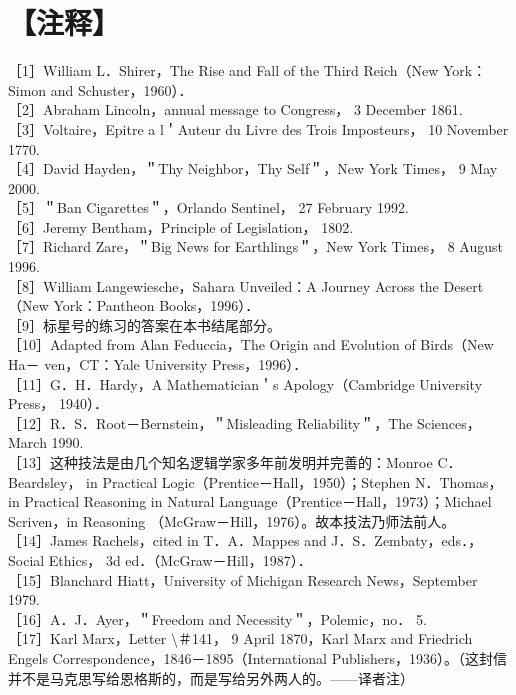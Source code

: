 \section*{【注释】}
［1］William L．Shirer，The Rise and Fall of the Third Reich（New York：Simon and Schuster，1960）．\\
［2］Abraham Lincoln，annual message to Congress， 3 December 1861.\\
［3］Voltaire，Epitre a l＇Auteur du Livre des Trois Imposteurs， 10 November\\
1770.\\
［4］David Hayden，＂Thy Neighbor，Thy Self＂，New York Times， 9 May 2000.\\
［5］＂Ban Cigarettes＂，Orlando Sentinel， 27 February 1992.\\
［6］Jeremy Bentham，Principle of Legislation， 1802.\\
［7］Richard Zare，＂Big News for Earthlings＂，New York Times， 8 August 1996.\\
［8］William Langewiesche，Sahara Unveiled：A Journey Across the Desert（New York：Pantheon Books，1996）．\\
［9］标星号的练习的答案在本书结尾部分。\\
［10］Adapted from Alan Feduccia，The Origin and Evolution of Birds（New Ha－ ven，CT：Yale University Press，1996）．\\
［11］G．H．Hardy，A Mathematician＇s Apology（Cambridge University Press， 1940）．\\
［12］R．S．Root－Bernstein，＂Misleading Reliability＂，The Sciences，March 1990.\\
［13］这种技法是由几个知名逻辑学家多年前发明并完善的：Monroe C．Beardsley， in Practical Logic（Prentice－Hall，1950）；Stephen N．Thomas，in Practical Reasoning in Natural Language（Prentice－Hall，1973）；Michael Scriven，in Reasoning （McGraw－Hill，1976）。故本技法乃师法前人。\\
［14］James Rachels，cited in T．A．Mappes and J．S．Zembaty，eds．，Social Ethics， 3d ed．（McGraw－Hill，1987）．\\
［15］Blanchard Hiatt，University of Michigan Research News，September 1979.\\
［16］A．J．Ayer，＂Freedom and Necessity＂，Polemic，no． 5.\\
［17］Karl Marx，Letter \textbackslash ＃141， 9 April 1870，Karl Marx and Friedrich Engels Correspondence，1846－1895（International Publishers，1936）。（这封信并不是马克思写给恩格斯的，而是写给另外两人的。——译者注）\\
